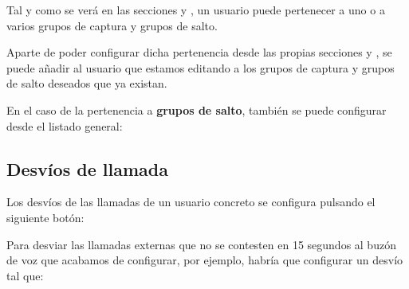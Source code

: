\documentclass[letterpaper,10pt,spanish]{sphinxmanual}
\begin{document}
Tal y como se verá en las secciones {\hyperref[pbx_features/huntgroups:huntgroups]{}} y {\hyperref[pbx_features/call_captures:capture\string-groups]{}}, un usuario puede pertenecer a uno o a varios grupos de captura y grupos de salto.

Aparte de poder configurar dicha pertenencia desde las propias secciones {\hyperref[pbx_features/huntgroups:huntgroups]{}} y {\hyperref[pbx_features/call_captures:capture\string-groups]{}}, se puede añadir al usuario que estamos editando a los grupos de captura y grupos de salto deseados que ya existan.

En el caso de la pertenencia a \textbf{grupos de salto}, también se puede configurar desde el listado general:



\subsection{Desvíos de llamada}
\label{pbx_features/users:user-call-forward}
Los desvíos de las llamadas de un usuario concreto se configura pulsando el siguiente botón:

\label{pbx_features/users:fwd-to-vm}
Para desviar las llamadas externas que no se contesten en 15 segundos al buzón de voz que acabamos de configurar, por ejemplo, habría que configurar un desvío tal que:

\end{document}

